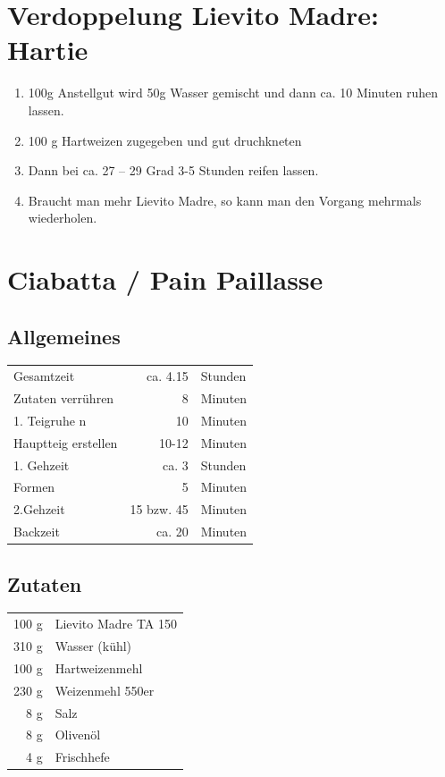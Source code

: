 \documentclass[10pt,a4paper,ngerman, DIV=16]{scrartcl}
\begin{document}
\section{Verdoppelung Lievito Madre: Hartie}\label{sec:Lievito Madre:Hartie}

\begin{enumerate}
    \item 100\;g Anstellgut wird 50\;g Wasser gemischt und dann ca. 10 Minuten ruhen lassen.  
    \item 100 g Hartweizen  zugegeben und gut druchkneten
    \item Dann bei ca. 27 -- 29 Grad 3-5 Stunden reifen lassen.
    \item Braucht man mehr Lievito Madre, so kann man den Vorgang mehrmals wiederholen.
\end{enumerate}


\section{Ciabatta / Pain Paillasse} \label{sec:brot:Ciabatta:LM}  

\subsection*{Allgemeines}
\begin{tabular}{lrl}
    Gesamtzeit          &   ca. 4.15 & Stunden \\
    Zutaten verrühren   &          8 & Minuten \\
    1. Teigruhe n       &         10 & Minuten \\
    Hauptteig erstellen &      10-12 & Minuten \\
    1. Gehzeit          &      ca. 3 & Stunden \\
    Formen              &          5 & Minuten \\
    2.Gehzeit           & 15 bzw. 45 & Minuten \\
    Backzeit            &     ca. 20 & Minuten
\end{tabular} 

\subsection*{Zutaten}

\begin{tabular}{r l}
    100 g & Lievito Madre TA 150 \\
    310 g & Wasser (kühl)        \\
    100 g & Hartweizenmehl       \\
    230 g & Weizenmehl  550er    \\
    8 g & Salz                 \\
    8 g & Olivenöl             \\
    4 g & Frischhefe
\end{tabular}
\end{document}
